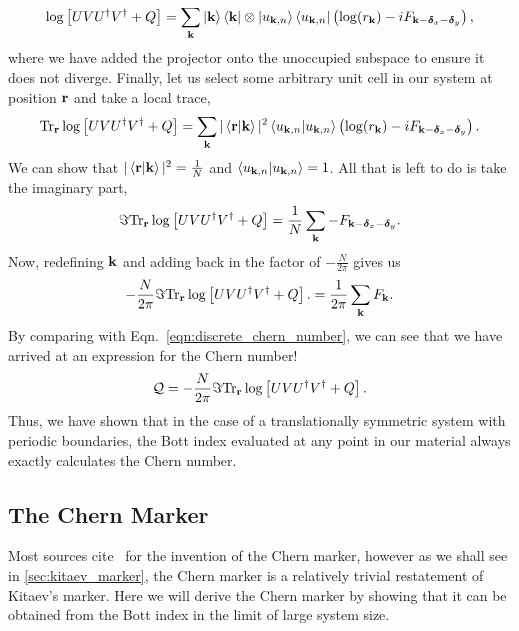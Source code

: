 \begin{align}
	\log \left [  U V U^\dag  V^\dag +  Q \right ] = \sum_{\textbf k} \ket{\textbf k } \bra{\textbf k } \otimes  \ket {u_{\textbf k, n}} \bra{u_{\textbf k, n}}
	\left ( \log(r_{\textbf k})-i F_{\textbf k-\boldsymbol{\delta}_x-\boldsymbol{\delta}_y}\right ),
\end{align}
where we have added the projector onto the unoccupied subspace to ensure it does not diverge. Finally, let us select some arbitrary unit cell in our system at position $\textbf r$ and take a local trace, 
\begin{align}
	\textup{Tr}_{\textbf r}
	\log \left [  U V U^\dag  V^\dag +  Q \right ]   
	= \sum_{\textbf k} 
	|\braket{\textbf r|\textbf k}|^2 
	\braket{u_{\textbf k, n}|u_{\textbf k, n} }  
	\left ( 
		\log(r_{\textbf k})-i F_{\textbf k-\boldsymbol{\delta}_x-\boldsymbol{\delta}_y}
	\right ).
\end{align}
We can show that $|\braket{\textbf r|\textbf k}|^2 = \frac{1}{N}$ and $\braket{u_{\textbf k, n}|u_{\textbf k, n} } = 1$. All that is left to do is take the imaginary part, 
\begin{align}
	\Im 
	\textup{Tr}_{\textbf r}
	\log \left [  U V U^\dag  V^\dag +  Q \right ]   
	= \frac{1}{N} \sum_{\textbf k} - F_{\textbf k-\boldsymbol{\delta}_x-\boldsymbol{\delta}_y} .
\end{align}
Now, redefining $\textbf k$ and adding back in the factor of $-\frac{N}{2\pi}$ gives us
\begin{align}
	-\frac{N}{2\pi} 
	\Im 
	\textup{Tr}_{\textbf r}
	\log \left [  U V U^\dag  V^\dag +  Q \right ].
	= \frac{1}{2\pi} \sum_{\textbf k}  F_{\textbf k}.
\end{align}
By comparing with Eqn.~\ref{eqn:discrete_chern_number}, we can see that we have arrived at an expression for the Chern number!
\begin{align}
	\mathcal Q = -\frac{N}{2\pi} 
	\Im 
	\textup{Tr}_{\textbf r}
	\log \left [  U V U^\dag  V^\dag +  Q \right ].
\end{align}
Thus, we have shown that in the case of a translationally symmetric system with periodic boundaries, the Bott index evaluated at any point in our material always exactly calculates the Chern number.

\subsection{The Chern Marker} \label{sec:chern_marker}

Most sources cite~\cite{bianco_mapping_2011} for the invention of the Chern marker, however as we shall see in \textsection\ref{sec:kitaev_marker}, the Chern marker is a relatively trivial restatement of Kitaev's marker. Here we will derive the Chern marker by showing that it can be obtained from the Bott index in the limit of large system size.

